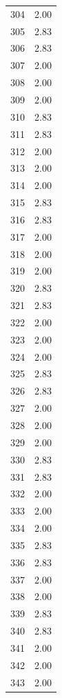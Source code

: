 \documentclass[a4paper,11pt]{article}
\begin{document}
\begin{center}
\begin{longtable}{|R{1.5cm}|R{2.5cm}|}
  304  &         2.00 \\ 
  305  &         2.83 \\ 
  306  &         2.83 \\ 
  307  &         2.00 \\ 
  308  &         2.00 \\ 
  309  &         2.00 \\ 
  310  &         2.83 \\ 
  311  &         2.83 \\ 
  312  &         2.00 \\ 
  313  &         2.00 \\ 
  314  &         2.00 \\ 
  315  &         2.83 \\ 
  316  &         2.83 \\ 
  317  &         2.00 \\ 
  318  &         2.00 \\ 
  319  &         2.00 \\ 
  320  &         2.83 \\ 
  321  &         2.83 \\ 
  322  &         2.00 \\ 
  323  &         2.00 \\ 
  324  &         2.00 \\ 
  325  &         2.83 \\ 
  326  &         2.83 \\ 
  327  &         2.00 \\ 
  328  &         2.00 \\ 
  329  &         2.00 \\ 
  330  &         2.83 \\ 
  331  &         2.83 \\ 
  332  &         2.00 \\ 
  333  &         2.00 \\ 
  334  &         2.00 \\ 
  335  &         2.83 \\ 
  336  &         2.83 \\ 
  337  &         2.00 \\ 
  338  &         2.00 \\ 
  339  &         2.83 \\ 
  340  &         2.83 \\ 
  341  &         2.00 \\ 
  342  &         2.00 \\ 
  343  &         2.00 \\ 

\end{longtable}
\end{center}
\end{document}
